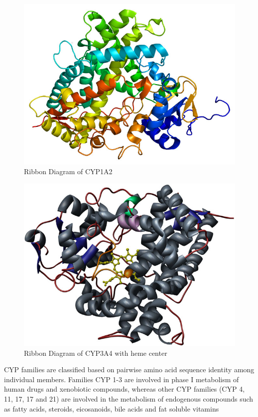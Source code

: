 \begin{figure}[H]
  \caption{Ribbon Diagram of CYP1A2}
  \centering
   \includegraphics[width=1\textwidth]{../img/CYP1A2_PDB.jpg}
\end{figure}

\begin{figure}[h,t]
  \caption{Ribbon Diagram of CYP3A4 with heme center}
  \centering
   \includegraphics[width=1\textwidth]{../img/CYP3A4_heme.jpg}
\end{figure}


CYP families are classified based on pairwise amino acid sequence identity among individual members. Families CYP 1-3 are involved in phase I metabolism of human drugs and xenobiotic compounds, whereas other CYP families (CYP 4, 11, 17, 17 and 21) are involved in the metabolism of endogenous compounds such as fatty acids, steroids, eicosanoids, bile acids and fat soluble vitamins\cite{Singh2011}

